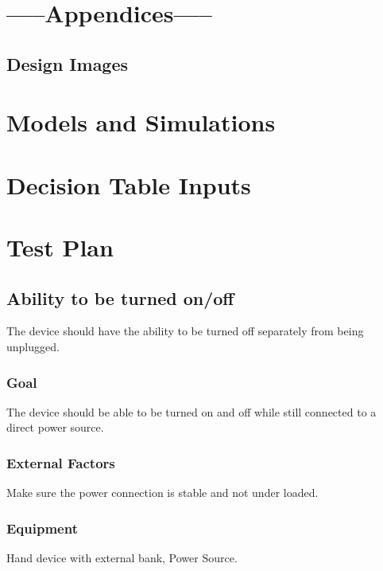\documentclass{article}
\begin{document}
\section{\bf{-----Appendices-----}}
\subsection{Design Images} 


\section{Models and Simulations}

\section{Decision Table Inputs}

\section{Test Plan}
\subsection{Ability to be turned on/off}
The device should have the ability to be turned off separately from being unplugged.

\subsubsection{Goal} The device should be able to be turned on and off while still connected to a direct power source.

\subsubsection{External Factors} Make sure the power connection is stable and not under loaded.

\subsubsection{Equipment} Hand device with external bank, Power Source.
\end{document}
